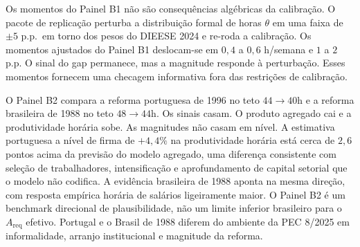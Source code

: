 \documentclass[10pt,twocolumn]{article}
\begin{document}
Os momentos do Painel B1 n\~ao s\~ao consequ\^encias alg\'ebricas da calibra\c{c}\~ao. O pacote de replica\c{c}\~ao perturba a distribui\c{c}\~ao formal de horas $\theta$ em uma faixa de $\pm 5$ p.p.\ em torno dos pesos do DIEESE 2024 e re-roda a calibra\c{c}\~ao. Os momentos ajustados do Painel B1 deslocam-se em $0{,}4$ a $0{,}6$ h/semana e $1$ a $2$ p.p. O sinal do gap permanece, mas a magnitude responde \`a perturba\c{c}\~ao. Esses momentos fornecem uma checagem informativa fora das restri\c{c}\~oes de calibra\c{c}\~ao.

O Painel B2 compara a reforma portuguesa de 1996 no teto $44\to 40$h e a reforma brasileira de 1988 no teto $48\to 44$h. Os sinais casam. O produto agregado cai e a produtividade hor\'aria sobe. As magnitudes n\~ao casam em n\'ivel. A estimativa portuguesa a n\'ivel de firma de $+4{,}4\%$ na produtividade hor\'aria est\'a cerca de $2{,}6$ pontos acima da previs\~ao do modelo agregado, uma diferen\c{c}a consistente com sele\c{c}\~ao de trabalhadores, intensifica\c{c}\~ao e aprofundamento de capital setorial que o modelo n\~ao codifica. A evid\^encia brasileira de 1988 aponta na mesma dire\c{c}\~ao, com resposta emp\'irica hor\'aria de sal\'arios ligeiramente maior. O Painel B2 \'e um benchmark direcional de plausibilidade, n\~ao um limite inferior brasileiro para o $A_{\text{req}}$ efetivo. Portugal e o Brasil de 1988 diferem do ambiente da PEC 8/2025 em informalidade, arranjo institucional e magnitude da reforma.
\end{document}
